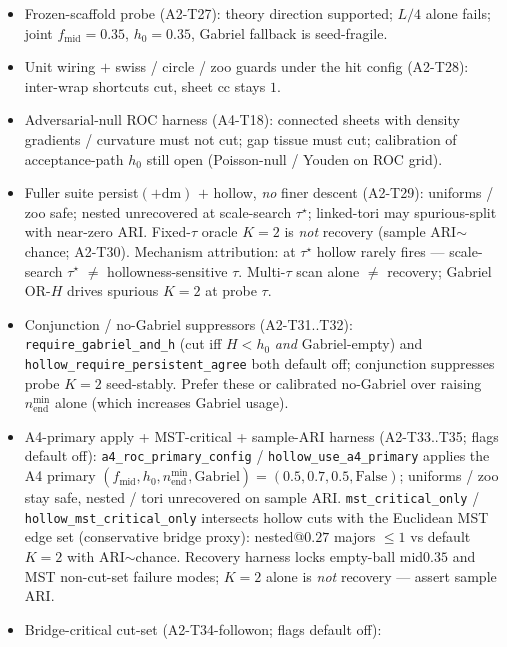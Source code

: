 \documentclass[11pt]{article}
\begin{document}
\begin{itemize}[leftmargin=1.5em]
  \item Frozen-scaffold probe (A2-T27): theory direction supported; $L/4$ alone
  fails; joint $f_{\mathrm{mid}}{=}0.35$, $h_0{=}0.35$, Gabriel fallback is
  seed-fragile.
  \item Unit wiring $+$ swiss / circle / zoo guards under the hit config
  (A2-T28): inter-wrap shortcuts cut, sheet $\mathrm{cc}$ stays $1$.
  \item Adversarial-null ROC harness (A4-T18): connected sheets with density
  gradients / curvature must not cut; gap tissue must cut; calibration of
  acceptance-path $h_0$ still open (Poisson-null / Youden on ROC grid).
  \item Fuller suite persist$(+\mathrm{dm})$ $+$ hollow, \emph{no} finer
  descent (A2-T29): uniforms / zoo safe; nested unrecovered at scale-search
  $\tau^\star$; linked-tori may spurious-split with near-zero ARI. Fixed-$\tau$
  oracle $K{=}2$ is \emph{not} recovery (sample ARI$\sim$chance; A2-T30).
  Mechanism attribution: at $\tau^\star$ hollow rarely fires --- scale-search
  $\tau^\star$ $\neq$ hollowness-sensitive $\tau$. Multi-$\tau$ scan alone
  $\neq$ recovery; Gabriel OR-$H$ drives spurious $K{=}2$ at probe $\tau$.
  \item Conjunction / no-Gabriel suppressors (A2-T31..T32):
  \texttt{require\_gabriel\_and\_h} (cut iff $H{<}h_0$ \emph{and}
  Gabriel-empty) and \texttt{hollow\_require\_persistent\_agree} both default
  off; conjunction suppresses probe $K{=}2$ seed-stably. Prefer these or
  calibrated no-Gabriel over raising $n_{\mathrm{end}}^{\min}$ alone (which
  increases Gabriel usage).
  \item A4-primary apply + MST-critical + sample-ARI harness (A2-T33..T35;
  flags default off): \texttt{a4\_roc\_primary\_config} /
  \texttt{hollow\_use\_a4\_primary} applies the A4 primary
  $(f_{\mathrm{mid}},h_0,n_{\mathrm{end}}^{\min},\mathrm{Gabriel})
  {=}(0.5,0.7,0.5,\mathrm{False})$; uniforms / zoo stay safe, nested / tori
  unrecovered on sample ARI. \texttt{mst\_critical\_only} /
  \texttt{hollow\_mst\_critical\_only} intersects hollow cuts with the
  Euclidean MST edge set (conservative bridge proxy): nested@$0.27$ majors
  $\le 1$ vs default $K{=}2$ with ARI$\sim$chance. Recovery harness locks
  empty-ball mid$0.35$ and MST non-cut-set failure modes; $K{=}2$ alone is
  \emph{not} recovery --- assert sample ARI.
  \item Bridge-critical cut-set (A2-T34-followon; flags default off):

\end{itemize}
\end{document}
